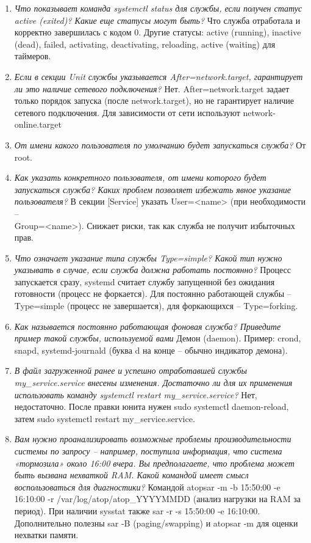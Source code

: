 \begin{enumerate}
	\item \textit{Что показывает команда systemctl status для службы, если получен статус active (exited)? Какие еще статусы могут быть?}\newline 
	Что служба отработала и корректно завершилась с кодом 0. 
	Другие статусы: active (running), inactive (dead), failed, activating, deactivating, reloading, active (waiting) для таймеров.
	\item \textit{Если в секции Unit службы указывается After=network.target, гарантирует ли это наличие сетевого подключения?}\newline
	Нет. After=network.target задает только порядок запуска (после network.target), но не гарантирует наличие сетевого подключения. Для зависимости от сети используют network-online.target
	\item \textit{От имени какого пользователя по умолчанию будет запускаться служба?}\newline 
	От root.
	\item \textit{Как указать конкретного пользователя, от имени которого будет запускаться служба? Каких проблем позволяет избежать явное указание пользователя?}\newline 
	В секции [Service] указать User=<name> (при необходимости -- \\ Group=<name>). 
	Снижает риски, так как служба не получит избыточных прав.
	\item \textit{Что означает указание типа службы Type=simple? Какой тип нужно указывать в случае, если служба должна работать постоянно?}\newline 
	Процесс запускается сразу, systemd считает службу запущенной без ожидания готовности (процесс не форкается).
	Для постоянно работающей службы -- Type=simple (процесс не завершается), для форкающихся -- Type=forking.
	\item \textit{Как называется постоянно работающая фоновая служба? Приведите пример такой службы, используемой вами }\newline 
	Демон (daemon). 
	Пример: crond, snapd, systemd-journald (буква d на конце -- обычно индикатор демона).
	\item \textit{В файл загруженной ранее и успешно отработавшей службы \\ my\_service.service внесены изменения. Достаточно ли для их применения использовать команду systemctl restart my\_service.service?}\newline 
	Нет, недостаточно. После правки юнита нужен sudo systemctl daemon-reload, затем sudo systemctl restart my\_service.service.
	\item \textit{Вам нужно проанализировать возможные проблемы производительности системы по запросу – например, поступила информация, что система «тормозила» около 16:00 вчера. Вы предполагаете, что проблема может быть вызвана нехваткой RAM. Какой командой имеет смысл воспользоваться для диагностики?}\newline 
	Командой atopsar -m -b 15:50:00 -e 16:10:00 -r /var/log/atop/atop\_YYYYMMDD (анализ нагрузки на RAM за период). 
	При наличии sysstat также sar -r -s 15:50:00 -e 16:10:00. Дополнительно полезны sar -B (paging/swapping) и atopsar -m для оценки нехватки памяти.
\end{enumerate}
